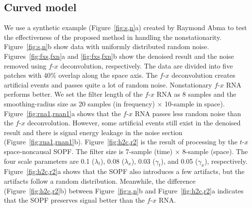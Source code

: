 \subsection{Curved model}
We use a synthetic example (Figure~\ref{fig:s,n}a) created by Raymond
Abma \cite[]{Liu11} to test the effectiveness of the proposed method
in handling the nonstationarity. Figure~\ref{fig:s,n}b
show data with uniformly distributed random
noise. Figures~\ref{fig:fxs,fxn}a and
\ref{fig:fxs,fxn}b show the denoised result and the noise 
removed using $f$-$x$ deconvolution, respectively. The data
are divided into five patches with 40\% overlap along the space
axis. The $f$-$x$ deconvolution creates artificial events and passes
quite a lot of random noise. Nonstationary $f$-$x$ RNA performs
better. We set the filter length of the $f$-$x$ RNA as 8 samples and
the smoothing-radius size
as 20 samples (in frequency) $\times$
10-sample in space). Figure~\ref{fig:rna1,rnan1}a shows that
the $f$-$x$ RNA passes less random noise than the $f$-$x$
deconvolution. However, some artificial events still exist in the
denoised result and there is signal energy leakage in the noise
section (Figure~\ref{fig:rna1,rnan1}b). Figure~\ref{fig:h2c,r2} is the
result of processing by the $t$-$x$ space-noncausal SOPF. The filter
size is 7-sample (time) $\times$ 8-sample (space). The four scale
parameters are 0.1 ($\lambda_t$), 0.08 ($\lambda_x$), 0.03
($\gamma_t$), and 0.05 ($\gamma_x$),
respectively. Figure~\ref{fig:h2c,r2}a shows that the SOPF also
introduces a few artifacts, but the artifacts follow a random
distribution. Meanwhile, the difference (Figure~\ref{fig:h2c,r2}b)
between Figure~\ref{fig:s,n}b and Figure~\ref{fig:h2c,r2}a indicates
that the SOPF preserves signal better than the $f$-$x$ RNA.


